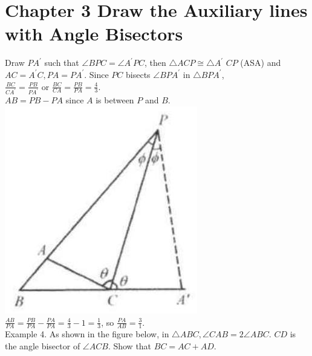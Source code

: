 \documentclass[10pt]{article}
\begin{document}
\section*{Chapter 3 Draw the Auxiliary lines with Angle Bisectors}
Draw \(P A^{\prime}\) such that \(\angle B P C=\angle A^{\prime} P C\), then \(\triangle A C P \cong \triangle A^{\prime}\) \(C P\) (ASA) and \(A C=A^{\prime} C, P A=P A^{\prime}\). Since \(P C\) bisects \(\angle B P A^{\prime}\) in \(\triangle B P A^{\prime}\),\\
\(\frac{B C}{C A^{\prime}}=\frac{P B}{P A^{\prime}}\) or \(\frac{B C}{C A}=\frac{P B}{P A}=\frac{4}{3}\).\\
\(A B=P B-P A\) since \(A\) is between \(P\) and \(B\).\\
\includegraphics[max width=\textwidth, center]{2025_04_17_97bc1f7e44d93c271a88g-056(3)}\\
\(\frac{A B}{P A}=\frac{P B}{P A}-\frac{P A}{P A}=\frac{4}{3}-1=\frac{1}{3}\), so \(\frac{P A}{A B}=\frac{3}{1}\).\\
Example 4. As shown in the figure below, in \(\triangle A B C, \angle C A B=2 \angle A B C\). \(C D\) is the angle bisector of \(\angle A C B\). Show that \(B C=A C+A D\).
\end{document}
